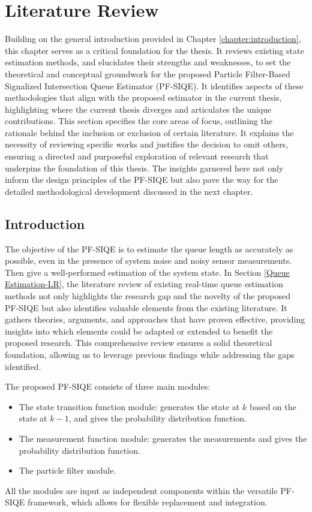 \chapter{Literature Review}
\label{chapter:Literature Review}
Building on the general introduction provided in Chapter \ref{chapter:introduction}, this chapter serves as a critical foundation for the thesis. It reviews existing state estimation methods, and elucidates their strengths and weaknesses, to set the theoretical and conceptual groundwork for the proposed Particle Filter-Based Signalized Intersection Queue Estimator (PF-SIQE). It identifies aspects of these methodologies that align with the proposed estimator in the current thesis, highlighting where the current thesis diverges and articulates the unique contributions. This section specifies the core areas of focus, outlining the rationale behind the inclusion or exclusion of certain literature. It explains the necessity of reviewing specific works and justifies the decision to omit others, ensuring a directed and purposeful exploration of relevant research that underpins the foundation of this thesis. The insights garnered here not only inform the design principles of the PF-SIQE but also pave the way for the detailed methodological development discussed in the next chapter. 


\section{Introduction}
The objective of the PF-SIQE is to estimate the queue length as accurately as possible, even in the presence of system noise and noisy sensor measurements. Then give a well-performed estimation of the system state. In Section \ref{Queue Estimation-LR}, the literature review of existing real-time queue estimation methods not only highlights the research gap and the novelty of the proposed PF-SIQE but also identifies valuable elements from the existing literature. It gathers theories, arguments, and approaches that have proven effective, providing insights into which elements could be adapted or extended to benefit the proposed research. This comprehensive review ensures a solid theoretical foundation, allowing us to leverage previous findings while addressing the gaps identified.

The proposed PF-SIQE consists of three main modules:
\begin{itemize}
    \item The state transition function module: generates the state at $k$ based on the state at $k-1$, and gives the probability distribution function.
    \item The measurement function module: generates the measurements and gives the probability distribution function.
    \item The particle filter module.
\end{itemize}
All the modules are input as independent components within the versatile PF-SIQE framework, which allows for flexible replacement and integration.

